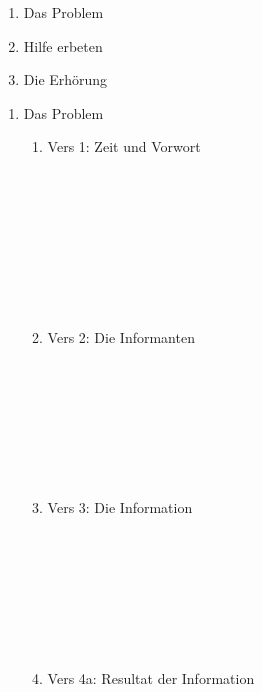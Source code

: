 \documentclass[fontsize=16pt]{mybib}
\begin{document}
    \begin{enumerate}
        \item Das Problem 
        \item Hilfe erbeten 
        \item Die Erhörung 
    \end{enumerate}

    \begin{enumerate}
        \item Das Problem
        \begin{enumerate}
            \item Vers 1: Zeit und Vorwort
            \\
            \\
            \\
            \\
            \\
            \\
            \\
            \\
            \\
            \item Vers 2: Die Informanten            
            \\
            \\
            \\
            \\
            \\
            \\
            \\
            \\
            \item Vers 3: Die Information
            \\
            \\
            \\
            \\
            \\
            \\
            \\
            \\
            \item Vers 4a: Resultat der Information
            \\
            \\
            \\
            \\
            \\

\end{enumerate}
\end{enumerate}
\end{document}

